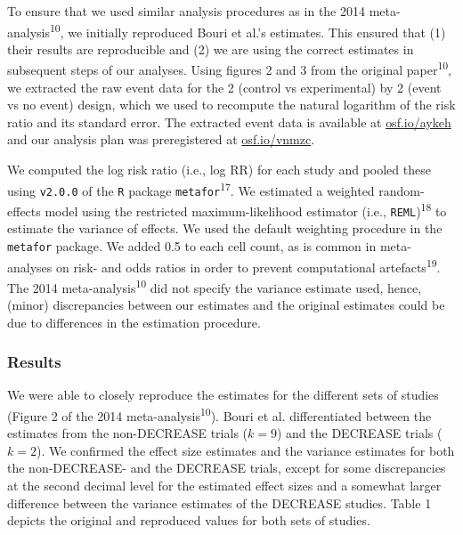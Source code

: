 \documentclass[]{article}
\begin{document}
To ensure that we used similar analysis procedures as in the 2014
meta-analysis\textsuperscript{10}, we initially reproduced Bouri et
al.'s estimates. This ensured that (1) their results are reproducible
and (2) we are using the correct estimates in subsequent steps of our
analyses. Using figures 2 and 3 from the original
paper\textsuperscript{10}, we extracted the raw event data for the 2
(control vs experimental) by 2 (event vs no event) design, which we used
to recompute the natural logarithm of the risk ratio and its standard
error. The extracted event data is available at
\href{https://osf.io/aykeh}{osf.io/aykeh} and our analysis plan was
preregistered at \href{https://osf.io/vnmzc}{osf.io/vnmzc}.

We computed the log risk ratio (i.e., log RR) for each study and pooled
these using \texttt{v2.0.0} of the \texttt{R} package
\texttt{metafor}\textsuperscript{17}. We estimated a weighted
random-effects model using the restricted maximum-likelihood estimator
(i.e., \texttt{REML})\textsuperscript{18} to estimate the variance of
effects. We used the default weighting procedure in the \texttt{metafor}
package. We added 0.5 to each cell count, as is common in meta-analyses
on risk- and odds ratios in order to prevent computational
artefacts\textsuperscript{19}. The 2014
meta-analysis\textsuperscript{10} did not specify the variance estimate
used, hence, (minor) discrepancies between our estimates and the
original estimates could be due to differences in the estimation
procedure.

\subsubsection{Results}\label{results}

We were able to closely reproduce the estimates for the different sets
of studies (Figure 2 of the 2014 meta-analysis\textsuperscript{10}).
Bouri et al. differentiated between the estimates from the non-DECREASE
trials (\(k=9\)) and the DECREASE trials (\(k=2\)). We confirmed the
effect size estimates and the variance estimates for both the
non-DECREASE- and the DECREASE trials, except for some discrepancies at
the second decimal level for the estimated effect sizes and a somewhat
larger difference between the variance estimates of the DECREASE
studies. Table 1 depicts the original and reproduced values for both
sets of studies.
\end{document}

